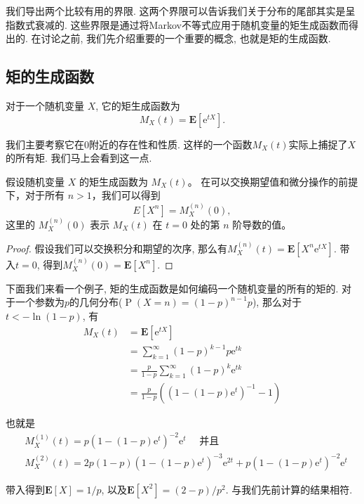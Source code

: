 我们导出两个比较有用的界限. 这两个界限可以告诉我们关于分布的尾部其实是呈指数式衰减的. 这些界限是通过将Markov不等式应用于随机变量的矩生成函数而得出的. 在讨论之前, 我们先介绍重要的一个重要的概念, 也就是矩的生成函数. 

\subsection{矩的生成函数}

\begin{definition}
    对于一个随机变量 $X$, 它的矩生成函数为$$M_X(t)=\mathbf{E}\left[\mathrm{e}^{t X}\right].$$
\end{definition}

我们主要考察它在0附近的存在性和性质. 这样的一个函数$M_X(t)$实际上捕捉了$X$的所有矩. 我们马上会看到这一点.

\begin{theorem}
    假设随机变量 $X$ 的矩生成函数为 $M_X(t)$。
在可以交换期望值和微分操作的前提下，对于所有 $n > 1$，我们可以得到
$$E[X^n] = M_X^{(n)}(0),$$这里的 $M_X^{(n)}(0)$ 表示 $M_X(t)$ 在 $t = 0$ 处的第 $n$ 阶导数的值。

\end{theorem}
\begin{proof}
    假设我们可以交换积分和期望的次序, 那么有$M_X^{(n)}(t)=\mathbf{E}\left[X^n \mathrm{e}^{t X}\right]$. 带入$t=0$, 得到$M_X^{(n)}(0)=\mathbf{E}\left[X^n\right]$. 
\end{proof}

\begin{example}
    下面我们来看一个例子, 矩的生成函数是如何编码一个随机变量的所有的矩的. 对于一个参数为$p$的几何分布($\operatorname{P}(X=n)=(1-p)^{n-1} p$), 那么对于$t<-\ln(1-p)$, 有
    $$\begin{aligned} M_X(t) & =\mathbf{E}\left[\mathrm{e}^{t X}\right] \\ & =\sum_{k=1}^{\infty}(1-p)^{k-1} p \mathrm{e}^{t k} \\ & =\frac{p}{1-p} \sum_{k=1}^{\infty}(1-p)^k \mathrm{e}^{t k} \\ & =\frac{p}{1-p}\left(\left(1-(1-p) \mathrm{e}^t\right)^{-1}-1\right)\end{aligned}$$

    也就是
    $$\begin{aligned} & M_X^{(1)}(t)=p\left(1-(1-p) \mathrm{e}^t\right)^{-2} \mathrm{e}^t \quad \text { 并且 } \\ & M_X^{(2)}(t)=2 p(1-p)\left(1-(1-p) \mathrm{e}^t\right)^{-3} \mathrm{e}^{2 t}+p\left(1-(1-p) \mathrm{e}^t\right)^{-2} \mathrm{e}^t\end{aligned}$$

    带入得到$\mathbf{E}[X]=1 / p$, 以及$\mathbf{E}\left[X^2\right]=(2-p) / p^2$. 与我们先前计算的结果相符.
\end{example}


